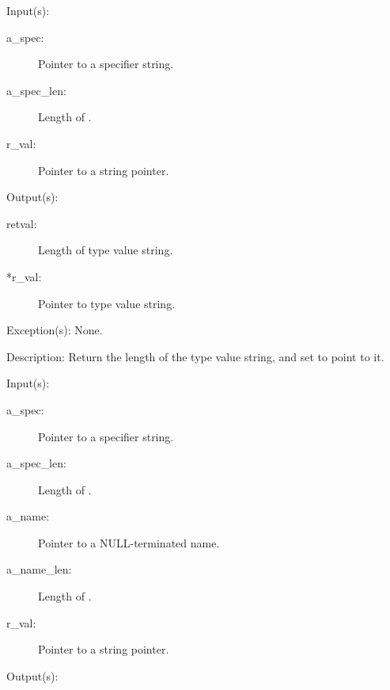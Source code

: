 \begin{capi}
\begin{capilist}
	\end{capilist}
\label{spec_type_get}
	\begin{capilist}
	\item[Input(s): ]
		\begin{description}\item[]
		\item[a\_spec: ]
			Pointer to a specifier string.
		\item[a\_spec\_len: ]
			Length of .
		\item[r\_val: ]
			Pointer to a string pointer.
		\end{description}
	\item[Output(s): ]
		\begin{description}\item[]
		\item[retval: ]
			Length of type value string.
		\item[*r\_val: ]
			Pointer to type value string.
		\end{description}
	\item[Exception(s): ] None.
	\item[Description: ]
		Return the length of the type value string, and set
		 to point to it.
	\end{capilist}
\label{spec_val_get}
	\begin{capilist}
	\item[Input(s): ]
		\begin{description}\item[]
		\item[a\_spec: ]
			Pointer to a specifier string.
		\item[a\_spec\_len: ]
			Length of \cvar{a\_spec}.
		\item[a\_name: ]
			Pointer to a NULL-terminated name.
		\item[a\_name\_len: ]
			Length of \cvar{a\_name}.
		\item[r\_val: ]
			Pointer to a string pointer.
		\end{description}
	\item[Output(s): ]
		\begin{description}\item[]

\end{description}
\end{capilist}
\end{capi}

